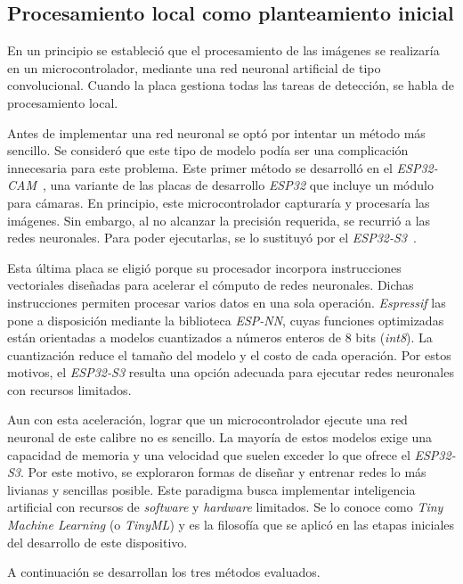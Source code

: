 \subsection{Procesamiento local como planteamiento inicial}
\label{sec:procesamiento_local}

En un principio se estableció que el procesamiento de las imágenes se realizaría en un microcontrolador, mediante una red neuronal artificial de tipo convolucional. Cuando la placa gestiona todas las tareas de detección, se habla de procesamiento local.
 
Antes de implementar una red neuronal se optó por intentar un método más sencillo. Se consideró que este tipo de modelo podía ser una complicación innecesaria para este problema. Este primer método se desarrolló en el \emph{ESP32-CAM}~\cite{esp32cam}, una variante de las placas de desarrollo \emph{ESP32} que incluye un módulo para cámaras. En principio, este microcontrolador capturaría y procesaría las imágenes. Sin embargo, al no alcanzar la precisión requerida, se recurrió a las redes neuronales. Para poder ejecutarlas, se lo sustituyó por el \emph{ESP32-S3}~\cite{esp32s3}.
 
Esta última placa se eligió porque su procesador incorpora instrucciones vectoriales diseñadas para acelerar el cómputo de redes neuronales. Dichas instrucciones permiten procesar varios datos en una sola operación. \emph{Espressif} las pone a disposición mediante la biblioteca \emph{ESP-NN}, cuyas funciones optimizadas están orientadas a modelos cuantizados a números enteros de 8 bits (\emph{int8}). La cuantización reduce el tamaño del modelo y el costo de cada operación. Por estos motivos, el \emph{ESP32-S3} resulta una opción adecuada para ejecutar redes neuronales con recursos limitados.
 
Aun con esta aceleración, lograr que un microcontrolador ejecute una red neuronal de este calibre no es sencillo. La mayoría de estos modelos exige una capacidad de memoria y una velocidad que suelen exceder lo que ofrece el \emph{ESP32-S3}. Por este motivo, se exploraron formas de diseñar y entrenar redes lo más livianas y sencillas posible. Este paradigma busca implementar inteligencia artificial con recursos de \emph{software} y \emph{hardware} limitados. Se lo conoce como \emph{Tiny Machine Learning} (o \emph{TinyML}) y es la filosofía que se aplicó en las etapas iniciales del desarrollo de este dispositivo.
 
A continuación se desarrollan los tres métodos evaluados.



